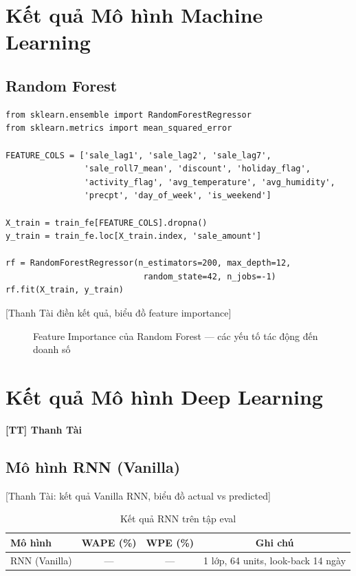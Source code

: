 \documentclass[12pt,a4paper]{report}
\newcommand{\ownerTT}{\colorbox{red!15}{\textbf{[TT] Thanh Tài}}}
\begin{document}
\section{Kết quả Mô hình Machine Learning}

\subsection{Random Forest}

\begin{lstlisting}[caption=Random Forest với lag features và đặc trưng ngoại sinh]
from sklearn.ensemble import RandomForestRegressor
from sklearn.metrics import mean_squared_error

FEATURE_COLS = ['sale_lag1', 'sale_lag2', 'sale_lag7',
                'sale_roll7_mean', 'discount', 'holiday_flag',
                'activity_flag', 'avg_temperature', 'avg_humidity',
                'precpt', 'day_of_week', 'is_weekend']

X_train = train_fe[FEATURE_COLS].dropna()
y_train = train_fe.loc[X_train.index, 'sale_amount']

rf = RandomForestRegressor(n_estimators=200, max_depth=12,
                            random_state=42, n_jobs=-1)
rf.fit(X_train, y_train)
\end{lstlisting}

[Thanh Tài điền kết quả, biểu đồ feature importance]

\begin{figure}[H]
    \centering
    \caption{Feature Importance của Random Forest --- các yếu tố tác động đến doanh số}
\end{figure}

\section{Kết quả Mô hình Deep Learning}
\ownerTT

\subsection{Mô hình RNN (Vanilla)}

[Thanh Tài: kết quả Vanilla RNN, biểu đồ actual vs predicted]

\begin{table}[H]
\centering
\caption{Kết quả RNN trên tập eval}
\begin{tabular}{lccc}
\toprule
\textbf{Mô hình} & \textbf{WAPE (\%)} & \textbf{WPE (\%)} & \textbf{Ghi chú} \\
\midrule
RNN (Vanilla) & --- & --- & 1 lớp, 64 units, look-back 14 ngày \\
\bottomrule
\end{tabular}
\end{table}
\end{document}
